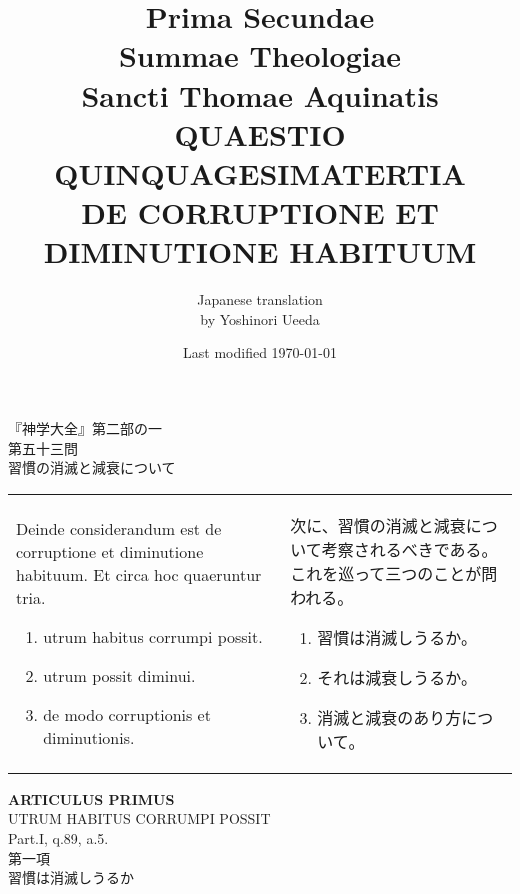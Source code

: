 \documentclass[10pt]{jsarticle} %
\title{{\bf Prima Secundae}\\{\HUGE Summae Theologiae}\\Sancti Thomae
Aquinatis\\{\sffamily QUAESTIO QUINQUAGESIMATERTIA}\\{\bf DE CORRUPTIONE ET DIMINUTIONE
HABITUUM}}
\author{Japanese translation\\by Yoshinori {\sc Ueeda}}
\date{Last modified \today}
\begin{document}
\maketitle
\thispagestyle{empty}
\begin{center}
{\Large 『神学大全』第二部の一\\第五十三問\\習慣の消滅と減衰について}
\end{center}


\begin{longtable}{p{21em}p{21em}}
Deinde considerandum est de corruptione et diminutione habituum. Et circa hoc quaeruntur tria. 



\begin{enumerate}
 \item utrum habitus corrumpi possit.
 \item utrum possit diminui.
 \item de modo corruptionis et diminutionis.
\end{enumerate}

&

次に、習慣の消滅と減衰について考察されるべきである。これを巡って三つのことが問われる。
\begin{enumerate}
 \item 習慣は消滅しうるか。
 \item それは減衰しうるか。
 \item 消滅と減衰のあり方について。
\end{enumerate}
\end{longtable}
\newpage
{}
\begin{center}
{\Large {\bf ARTICULUS PRIMUS}}\\
{\large UTRUM HABITUS CORRUMPI POSSIT}\\
{\footnotesize Part.I, q.89, a.5.}\\
{\Large 第一項\\習慣は消滅しうるか}
\end{center}
\end{document}
